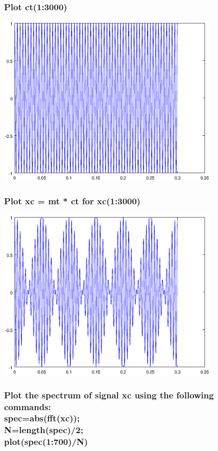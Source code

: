 \documentclass[12pt,a4paper]{article}
\begin{document}
\subsubsection{Plot ct(1:3000)}
\includegraphics[width=0.8\textwidth]{2b.eps}
\subsubsection{Plot xc = mt * ct for xc(1:3000)}
\includegraphics[width=0.8\textwidth]{2c.eps}

\subsubsection{Plot the spectrum of signal xc using the following commands:\\spec=abs(fft(xc));\\N=length(spec)/2;\\plot(spec(1:700)/N)}
\end{document}
